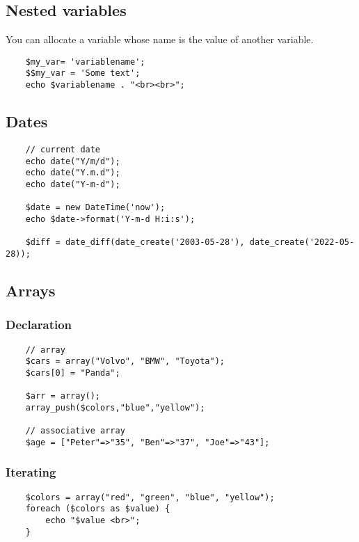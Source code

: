 \documentclass[a4paper]{article}
\begin{document}
\subsection{Nested variables}

You can allocate a variable whose name is the value of another variable.

\begin{lstlisting}
    $my_var= 'variablename';
    $$my_var = 'Some text';
    echo $variablename . "<br><br>";
\end{lstlisting}

\subsection{Dates}

\begin{lstlisting}
    // current date
    echo date("Y/m/d");
    echo date("Y.m.d");
    echo date("Y-m-d");

    $date = new DateTime('now');
    echo $date->format('Y-m-d H:i:s');

    $diff = date_diff(date_create('2003-05-28'), date_create('2022-05-28));
\end{lstlisting}

\subsection{Arrays}

\subsubsection{Declaration}

\begin{lstlisting}
    // array
    $cars = array("Volvo", "BMW", "Toyota");
    $cars[0] = "Panda";

    $arr = array();
    array_push($colors,"blue","yellow");
    
    // associative array
    $age = ["Peter"=>"35", "Ben"=>"37", "Joe"=>"43"];
\end{lstlisting}

\subsubsection{Iterating}

\begin{lstlisting}
    $colors = array("red", "green", "blue", "yellow");
    foreach ($colors as $value) {
        echo "$value <br>";
    }
\end{lstlisting}
\end{document}
